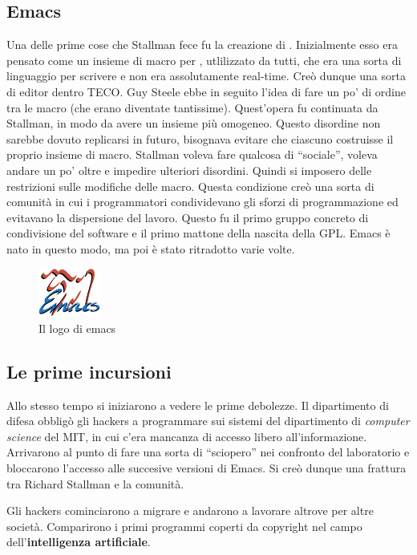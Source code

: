 \subsection{Emacs}

Una delle prime cose che Stallman fece fu la creazione di . Inizialmente esso era pensato come un insieme di macro per , utlilizzato da tutti, che era una sorta di linguaggio per scrivere e non era assolutamente real-time. Creò dunque una sorta di editor dentro TECO. Guy Steele ebbe in seguito l'idea di fare un po' di ordine tra le macro (che erano diventate tantissime). Quest'opera fu continuata da Stallman, in modo da avere un insieme più omogeneo. Questo disordine non sarebbe dovuto replicarsi in futuro, bisognava evitare che ciascuno costruisse il proprio insieme di macro. Stallman voleva fare qualcosa di ``sociale'', voleva andare un po' oltre e impedire ulteriori disordini. Quindi si imposero delle restrizioni sulle modifiche delle macro. Questa condizione creò una sorta di comunità in cui i programmatori condividevano gli sforzi di programmazione ed evitavano la dispersione del lavoro. Questo fu il primo gruppo concreto di condivisione del software e il primo mattone della nascita della GPL. Emacs è nato in questo modo, ma poi è stato ritradotto varie volte.

\begin{figure}[htbp]
\centering
\includegraphics[width=20mm]{images/emacs.png}
\caption{Il logo di emacs}
\end{figure}

\subsection{Le prime incursioni}

Allo stesso tempo si iniziarono a vedere le prime debolezze. Il dipartimento di difesa obbligò gli hackers a programmare sui sistemi del dipartimento di \textit{computer science} del MIT, in cui c'era mancanza di accesso libero all'informazione. Arrivarono al punto di fare una sorta di ``sciopero'' nei confronto del laboratorio e bloccarono l'accesso alle succesive versioni di Emacs. Si creò dunque una frattura tra Richard Stallman e la comunità.

Gli hackers cominciarono a migrare e andarono a lavorare altrove per altre società. Comparirono i primi programmi coperti da copyright nel campo dell'\textbf{intelligenza artificiale}.

